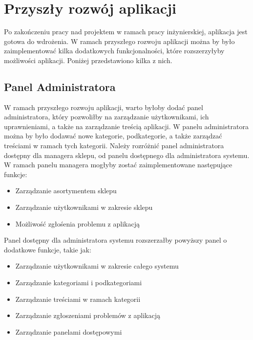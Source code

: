 \section{Przyszły rozwój aplikacji}

Po zakończeniu pracy nad projektem w ramach pracy inżynierskiej, aplikacja jest gotowa do wdrożenia. W ramach przyszłego rozwoju aplikacji można by było zaimplementować kilka dodatkowych funkcjonalności, które rozszerzyłyby możliwości aplikacji. Poniżej przedstawiono kilka z nich.

\subsection{Panel Administratora}
W ramach przyszłego rozwoju aplikacji, warto byłoby dodać panel administratora, który pozwoliłby na zarządzanie użytkownikami, ich uprawnieniami, a także na zarządzanie treścią aplikacji. W panelu administratora można by było dodawać nowe kategorie, podkategorie, a także zarządzać treściami w ramach tych kategorii.
Należy rozróżnić panel administratora dostępny dla managera sklepu, od panelu dostępnego dla administratora systemu. W ramach panelu managera mogłyby zostać zaimplementowane następujące funkcje:
\begin{itemize}
    \item Zarządzanie asortymentem sklepu
    \item Zarządzanie użytkownikami w zakresie sklepu
    \item Możliwość zgłośenia problemu z aplikacją
\end{itemize}
Panel dostępny dla administratora systemu rozszerzałby powyższy panel o dodatkowe funkcje, takie jak:
\begin{itemize}
    \item Zarządzanie użytkownikami w zakresie całego systemu
    \item Zarządzanie kategoriami i podkategoriami
    \item Zarządzanie treściami w ramach kategorii
    \item Zarządzanie zgłoszeniami problemów z aplikacją
    \item Zarządzanie panelami dostępowymi
\end{itemize}

